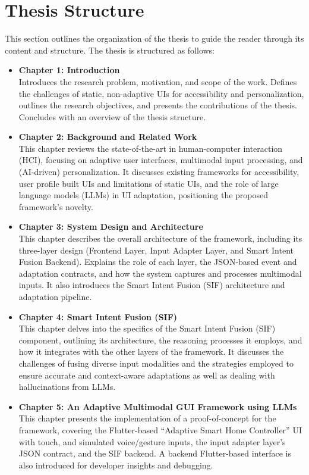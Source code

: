 \section{Thesis Structure}
This section outlines the organization of the thesis to guide the reader through its content and structure.
The thesis is structured as follows:
\begin{itemize}
     \item \textbf{Chapter 1: Introduction} \\
    Introduces the research problem, motivation, and scope of the work. Defines the challenges of static, non-adaptive UIs for accessibility and personalization, outlines the research objectives, and presents the contributions of the thesis. Concludes with an overview of the thesis structure.
    \item \textbf{Chapter 2: Background and Related Work} \\
    This chapter reviews the state-of-the-art in human-computer interaction (HCI), focusing on adaptive user interfaces, multimodal input processing, and (AI-driven) personalization. It discusses existing frameworks for accessibility, user profile built UIs and limitations of static UIs, and the role of large language models (LLMs) in UI adaptation, positioning the proposed framework’s novelty.
    \item \textbf{Chapter 3: System Design and Architecture} \\
    This chapter describes the overall architecture of the framework, including its three-layer design (Frontend Layer, Input Adapter Layer, and Smart Intent Fusion Backend). Explains the role of each layer, the JSON-based event and adaptation contracts, and how the system captures and processes multimodal inputs. It also introduces the Smart Intent Fusion (SIF) architecture and adaptation pipeline.
    \item \textbf{Chapter 4: Smart Intent Fusion (SIF)} \\
    This chapter delves into the specifics of the Smart Intent Fusion (SIF) component, outlining its architecture, the reasoning processes it employs, and how it integrates with the other layers of the framework. It discusses the challenges of fusing diverse input modalities and the strategies employed to ensure accurate and context-aware adaptations as well as dealing with hallucinations from LLMs.
    \item \textbf{Chapter 5: An Adaptive Multimodal GUI Framework using LLMs} \\
    This chapter presents the implementation of a proof-of-concept for the framework, covering the Flutter-based “Adaptive Smart Home Controller” UI with touch, and simulated voice/gesture inputs, the input adapter layer’s JSON contract, and the SIF backend. A backend Flutter-based interface is also introduced for developer insights and debugging.

\end{itemize}
